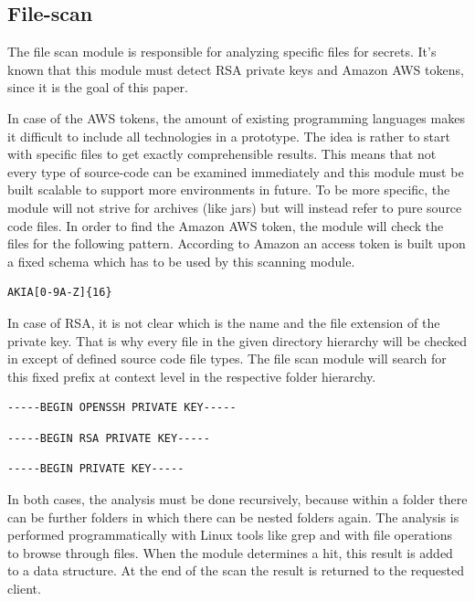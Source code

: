 \subsection{File-scan}
\label{ch:theory:analysing_process:scan}
The file scan module is responsible for analyzing specific files for secrets. It's known that this module must detect RSA private keys and Amazon AWS tokens, since it is the goal of this paper.

In case of the AWS tokens, the amount of existing programming languages makes it difficult to include all technologies in a prototype. The idea is rather to start with specific files to get exactly comprehensible results. This means that not every type of source-code can be examined immediately and this module must be built scalable to support more environments in future.
To be more specific, the module will not strive for archives (like jars) but will instead refer to pure source code files.
In order to find the Amazon AWS token, the module will check the files for the following pattern.
According to Amazon an access token is built upon a fixed schema which has to be used by this scanning module.
\begin{lstlisting}
AKIA[0-9A-Z]{16}
\end{lstlisting}

In case of RSA, it is not clear which is the name and the file extension of the private key. That is why every file in the given directory hierarchy will be checked in except of defined source code file types.
The file scan module will search for this fixed prefix at context level in the respective folder hierarchy.
\begin{lstlisting}
-----BEGIN OPENSSH PRIVATE KEY-----
\end{lstlisting}
\begin{lstlisting}
-----BEGIN RSA PRIVATE KEY-----
\end{lstlisting}
\begin{lstlisting}
-----BEGIN PRIVATE KEY-----
\end{lstlisting}

In both cases, the analysis must be done recursively, because within a folder there can be further folders in which there can be nested folders again.
The analysis is performed programmatically with Linux tools like grep and with file operations to browse through files.
When the module determines a hit, this result is added to a data structure. At the end of the scan the result is returned to the requested client.

